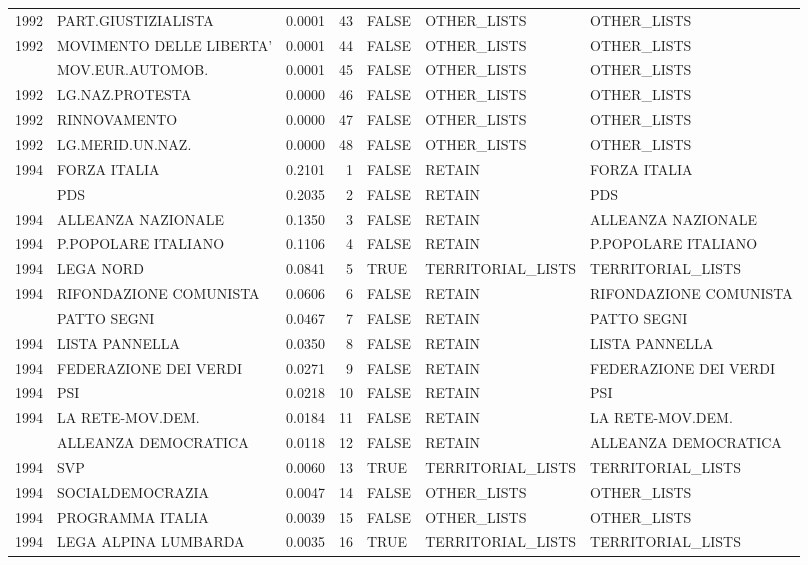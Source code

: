 \begin{longtable}[t]{rlrrlll}
1992 & PART.GIUSTIZIALISTA & 0.0001 & 43 & FALSE & OTHER\_LISTS & OTHER\_LISTS\\
1992 & MOVIMENTO DELLE LIBERTA' & 0.0001 & 44 & FALSE & OTHER\_LISTS & OTHER\_LISTS\\
\addlinespace
1992 & MOV.EUR.AUTOMOB. & 0.0001 & 45 & FALSE & OTHER\_LISTS & OTHER\_LISTS\\
1992 & LG.NAZ.PROTESTA & 0.0000 & 46 & FALSE & OTHER\_LISTS & OTHER\_LISTS\\
1992 & RINNOVAMENTO & 0.0000 & 47 & FALSE & OTHER\_LISTS & OTHER\_LISTS\\
1992 & LG.MERID.UN.NAZ. & 0.0000 & 48 & FALSE & OTHER\_LISTS & OTHER\_LISTS\\
1994 & FORZA ITALIA & 0.2101 & 1 & FALSE & RETAIN & FORZA ITALIA\\
\addlinespace
1994 & PDS & 0.2035 & 2 & FALSE & RETAIN & PDS\\
1994 & ALLEANZA NAZIONALE & 0.1350 & 3 & FALSE & RETAIN & ALLEANZA NAZIONALE\\
1994 & P.POPOLARE ITALIANO & 0.1106 & 4 & FALSE & RETAIN & P.POPOLARE ITALIANO\\
1994 & LEGA NORD & 0.0841 & 5 & TRUE & TERRITORIAL\_LISTS & TERRITORIAL\_LISTS\\
1994 & RIFONDAZIONE COMUNISTA & 0.0606 & 6 & FALSE & RETAIN & RIFONDAZIONE COMUNISTA\\
\addlinespace
1994 & PATTO SEGNI & 0.0467 & 7 & FALSE & RETAIN & PATTO SEGNI\\
1994 & LISTA PANNELLA & 0.0350 & 8 & FALSE & RETAIN & LISTA PANNELLA\\
1994 & FEDERAZIONE DEI VERDI & 0.0271 & 9 & FALSE & RETAIN & FEDERAZIONE DEI VERDI\\
1994 & PSI & 0.0218 & 10 & FALSE & RETAIN & PSI\\
1994 & LA RETE-MOV.DEM. & 0.0184 & 11 & FALSE & RETAIN & LA RETE-MOV.DEM.\\
\addlinespace
1994 & ALLEANZA DEMOCRATICA & 0.0118 & 12 & FALSE & RETAIN & ALLEANZA DEMOCRATICA\\
1994 & SVP & 0.0060 & 13 & TRUE & TERRITORIAL\_LISTS & TERRITORIAL\_LISTS\\
1994 & SOCIALDEMOCRAZIA & 0.0047 & 14 & FALSE & OTHER\_LISTS & OTHER\_LISTS\\
1994 & PROGRAMMA ITALIA & 0.0039 & 15 & FALSE & OTHER\_LISTS & OTHER\_LISTS\\
1994 & LEGA ALPINA LUMBARDA & 0.0035 & 16 & TRUE & TERRITORIAL\_LISTS & TERRITORIAL\_LISTS\\

\end{longtable}
